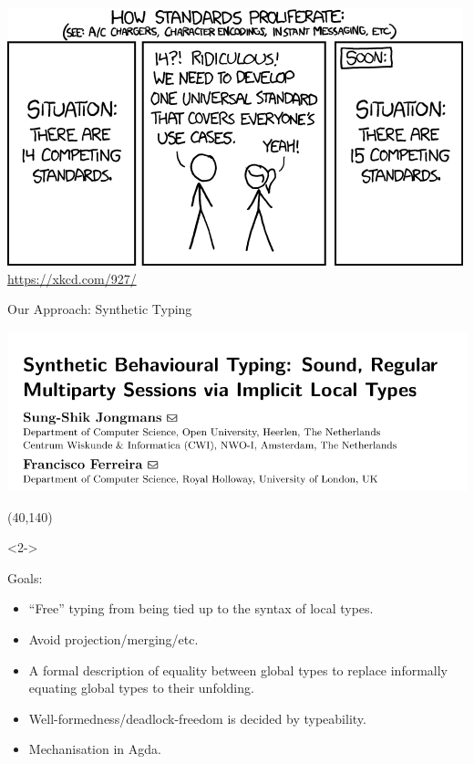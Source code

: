 \begin{frame}
  \includegraphics[width=\columnwidth]{figures/xkcd-standards.png}
  \href{https://xkcd.com/927/}{https://xkcd.com/927/}
\end{frame}


\begin{frame}{Our Approach: Synthetic Typing}
    \begin{minipage}{.86\columnwidth}
    \begin{sticky}
  \includegraphics[width=\textwidth]{figures/fs-synthetic.pdf}
    \end{sticky}
    \end{minipage}

  \Put(40,140){%
    \begin{onlyenv}<2->
    \begin{minipage}{.86\columnwidth}
      \begin{greenbox}
        Goals:
        \begin{itemize}
          \item ``Free'' typing from being tied up to the syntax of local types.
          \item Avoid projection/merging/etc.
\item A formal description of equality
  between global types to replace informally equating global types to
  their unfolding.
          \item Well-formedness/deadlock-freedom is decided by typeability.
          \item Mechanisation in Agda.
        \end{itemize}
      \end{greenbox}
    \end{minipage}
    \end{onlyenv}
   }
\end{frame}


